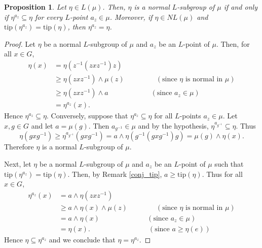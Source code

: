 \documentclass[10pt]{article}
\theoremstyle{plain}
\newtheorem{proposition}[theorem]{Proposition}
\theoremstyle{definition}
\theoremstyle{remark}
\theoremstyle{case}
\begin{document}
\begin{proposition}
	\label{nor_conj}
	Let $\eta \in L(\mu)$. Then, $\eta$ is a normal $L$-subgroup of $\mu$ if and only if  $\eta^{a_z} \subseteq \eta$ for every $L$-point $a_z \in \mu$. Moreover, if $\eta \in NL(\mu)$ and $\text{tip}(\eta^{a_z}) = \text{tip}(\eta)$, then $\eta^{a_z} = \eta$. 
\end{proposition}	
\begin{proof} Let $\eta$ be a normal $L$-subgroup of $\mu$ and $a_z$ be an $L$-point of $\mu$. Then, for all $x \in G$,
	\begin{equation*}
		\begin{split}
			\eta(x) &= \eta(z^{-1}(zxz^{-1})z) \\
			&\geq \eta(zxz^{-1}) \wedge \mu(z) \qquad\qquad~~ (\text{since $\eta$ is normal in $\mu$})\\
			&\geq \eta(zxz^{-1}) \wedge a \qquad\qquad \qquad (\text{since $a_z \in \mu$})\\
			&= \eta^{a_z}(x).
		\end{split}
	\end{equation*}
	Hence $\eta^{a_z} \subseteq \eta$. Conversely, suppose that $\eta^{a_z} \subseteq \eta$ for all $L$-points $a_z \in \mu$. Let $x, g \in G$ and let $a = \mu(g)$. Then $a_{g^{-1}} \in \mu$ and by the hypothesis, $\eta^{a_{g^{-1}}} \subseteq \eta$. Thus
	\[ \eta(gxg^{-1}) \geq \eta^{a_{g^{-1}}}(gxg^{-1}) = a \wedge \eta(g^{-1}(gxg^{-1})g) = \mu(g) \wedge \eta(x).  \]
	Therefore $\eta$ is a normal $L$-subgroup of $\mu$.
	
	\noindent Next, let $\eta$ be a normal $L$-subgroup of $\mu$ and $a_z$ be an $L$-point of $\mu$ such that $\text{tip}(\eta^{a_z}) = \text{tip}(\eta)$. Then, by Remark \ref{conj_tip}, $a \geq \text{tip}(\eta)$. Thus for all $x \in G$,
	\begin{equation*}
		\begin{split}
			\eta^{a_z}(x) &= a \wedge \eta(zxz^{-1}) \\
			&\geq a \wedge \eta(x) \wedge \mu(z) \qquad\qquad (\text{since $\eta$ is normal in $\mu$})\\
			&= a \wedge \eta(x)  \qquad\qquad\qquad~~~ (\text{since $a_z \in \mu$}) \\
			&= \eta(x). \qquad\qquad\qquad\qquad~ (\text{since $a \geq \eta(e)$})
		\end{split}
	\end{equation*}
	Hence $\eta \subseteq \eta^{a_z}$ and we conclude that $\eta = \eta^{a_z}$.
\end{proof}
\end{document}
